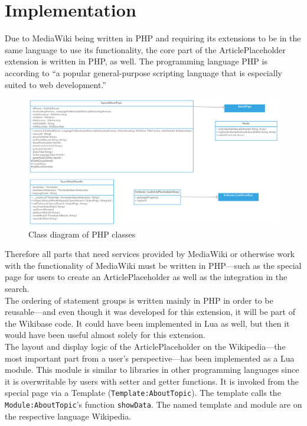 \chapter{Implementation}
	
	Due to MediaWiki being written in PHP and requiring its extensions to be in the same language to use its functionality, the core part of the ArticlePlaceholder extension is written in PHP, as well. The programming language PHP is according to \citep{php:01} ``a popular general-purpose scripting language that is especially suited to web development.'' \\
	\begin{figure}[H]
		\centering
		\includegraphics[width=\textwidth]{diagrams/ArticlePlaceholderClassDiagram.png}
		\caption{Class diagram of PHP classes}
		\label{fig:ClassDiagramPHP}
	\end{figure}
	Therefore all parts that need services provided by MediaWiki or otherwise work with the functionality of MediaWiki must be written in PHP---such as the special page for users to create an ArticlePlaceholder as well as the integration in the search. \\
	The ordering of statement groups is written mainly in PHP in order to be reusable---and even though it was developed for this extension, it will be part of the Wikibase code. It could have been implemented in Lua as well, but then it would have been useful almost solely for this extension. \\
	The layout and display logic of the ArticlePlaceholder on the Wikipedia---the most important part from a user's perspective---has been implemented as a Lua module. This module is similar to libraries in other programming languages since it is overwritable by users with setter and getter functions. It is invoked from the special page via a Template (\texttt{\justify Template:AboutTopic}). The template calls the \texttt{\justify Module:AboutTopic}'s function \texttt{\justify showData}. The named template and module are on the respective language Wikipedia. \\
	
	
	
	
	
	
	
	
	
	